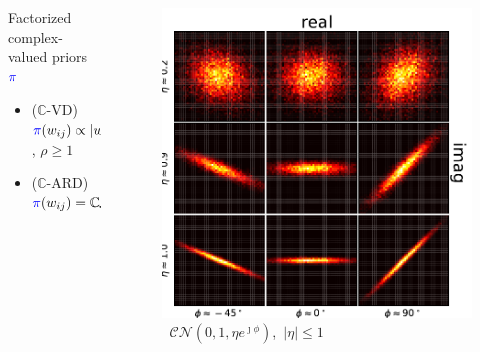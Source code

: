 \documentclass{beamer}
\newcommand{\cplx}{\mathbb{C}}
\begin{document}
\begin{frame}[c]{\insertsection}
  \bigskip
  \begin{columns}
    \begin{column}{0.60\linewidth}
      Factorized complex-valued priors ${\color{blue} \pi}$
      \begin{itemize}
        \item ($\cplx$-VD) $
          {\color{blue} \pi}(w_{ij})
              \propto \lvert w_{ij}\rvert^{-\rho}
        $, $\rho \geq 1$
        \smallskip
        \item ($\cplx$-ARD) $
          {\color{blue} \pi}(w_{ij})
              = \cplx\mathcal{N}(
                0, \tfrac1{{\color{teal} \tau_{ij}}}, 0
              )
        $
      \end{itemize}
    \end{column}
    \begin{column}{0.30\linewidth}
      \begin{figure}
        \centering
        \includegraphics[width=\linewidth]{figure__cplx_gaussian.pdf}
        \quad\mbox{
          \scriptsize
          $\mathcal{CN}(0, 1, \eta e^{\jmath \phi})$, $\lvert \eta \rvert \leq 1$
        }
      \end{figure}
    \end{column}
  \end{columns}
\end{frame}
\end{document}
